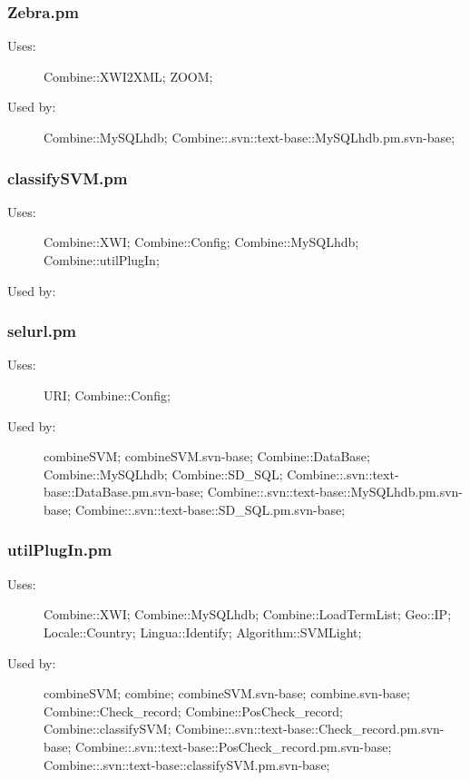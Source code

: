 \subsubsection{Zebra.pm}
\begin{description}
\item[Uses:] Combine::XWI2XML; ZOOM; 

\item[Used by:] Combine::MySQLhdb; Combine::.svn::text-base::MySQLhdb.pm.svn-base; 

\end{description}
\subsubsection{classifySVM.pm}
\begin{description}
\item[Uses:] Combine::XWI; Combine::Config; Combine::MySQLhdb; Combine::utilPlugIn; 

\item[Used by:] 

\end{description}
\subsubsection{selurl.pm}
\begin{description}
\item[Uses:] URI; Combine::Config; 

\item[Used by:] combineSVM; combineSVM.svn-base; Combine::DataBase; Combine::MySQLhdb; Combine::SD\_SQL; Combine::.svn::text-base::DataBase.pm.svn-base; Combine::.svn::text-base::MySQLhdb.pm.svn-base; Combine::.svn::text-base::SD\_SQL.pm.svn-base; 

\end{description}
\subsubsection{utilPlugIn.pm}
\begin{description}
\item[Uses:] Combine::XWI; Combine::MySQLhdb; Combine::LoadTermList; Geo::IP; Locale::Country; Lingua::Identify; Algorithm::SVMLight; 

\item[Used by:] combineSVM; combine; combineSVM.svn-base; combine.svn-base; Combine::Check\_record; Combine::PosCheck\_record; Combine::classifySVM; Combine::.svn::text-base::Check\_record.pm.svn-base; Combine::.svn::text-base::PosCheck\_record.pm.svn-base; Combine::.svn::text-base::classifySVM.pm.svn-base; 

\end{description}

